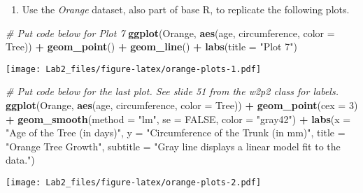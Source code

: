 \documentclass[
]{article}
\newenvironment{Shaded}{\begin{snugshade}}{\end{snugshade}}
\newcommand{\CommentTok}[1]{\textcolor[rgb]{0.56,0.35,0.01}{\textit{#1}}}
\newcommand{\DataTypeTok}[1]{\textcolor[rgb]{0.13,0.29,0.53}{#1}}
\newcommand{\DecValTok}[1]{\textcolor[rgb]{0.00,0.00,0.81}{#1}}
\newcommand{\KeywordTok}[1]{\textcolor[rgb]{0.13,0.29,0.53}{\textbf{#1}}}
\newcommand{\NormalTok}[1]{#1}
\newcommand{\OperatorTok}[1]{\textcolor[rgb]{0.81,0.36,0.00}{\textbf{#1}}}
\newcommand{\OtherTok}[1]{\textcolor[rgb]{0.56,0.35,0.01}{#1}}
\newcommand{\StringTok}[1]{\textcolor[rgb]{0.31,0.60,0.02}{#1}}
\providecommand{\tightlist}{%
  \setlength{\itemsep}{0pt}\setlength{\parskip}{0pt}}
\begin{document}
\newpage

\begin{enumerate}
\def\labelenumi{\arabic{enumi}.}
\setcounter{enumi}{2}
\tightlist
\item
  Use the \emph{Orange} dataset, also part of base R, to replicate the
  following plots.
\end{enumerate}

\begin{Shaded}
\begin{Highlighting}[]
\CommentTok{# Put code below for Plot 7}
\KeywordTok{ggplot}\NormalTok{(Orange, }\KeywordTok{aes}\NormalTok{(age, circumference, }\DataTypeTok{color =}\NormalTok{ Tree)) }\OperatorTok{+}
\StringTok{  }\KeywordTok{geom_point}\NormalTok{() }\OperatorTok{+}
\StringTok{  }\KeywordTok{geom_line}\NormalTok{() }\OperatorTok{+}
\StringTok{  }\KeywordTok{labs}\NormalTok{(}\DataTypeTok{title =} \StringTok{"Plot 7"}\NormalTok{)}
\end{Highlighting}
\end{Shaded}

\texttt{[image: Lab2\_files/figure-latex/orange-plots-1.pdf]}

\begin{Shaded}
\begin{Highlighting}[]
\CommentTok{# Put code below for the last plot. See slide 51 from the w2p2 class for labels.}
\KeywordTok{ggplot}\NormalTok{(Orange, }\KeywordTok{aes}\NormalTok{(age, circumference, }\DataTypeTok{color =}\NormalTok{ Tree)) }\OperatorTok{+}
\StringTok{  }\KeywordTok{geom_point}\NormalTok{(}\DataTypeTok{cex =} \DecValTok{3}\NormalTok{) }\OperatorTok{+}
\StringTok{  }\KeywordTok{geom_smooth}\NormalTok{(}\DataTypeTok{method =} \StringTok{"lm"}\NormalTok{, }\DataTypeTok{se =} \OtherTok{FALSE}\NormalTok{, }\DataTypeTok{color =} \StringTok{"gray42"}\NormalTok{) }\OperatorTok{+}
\StringTok{  }\KeywordTok{labs}\NormalTok{(}\DataTypeTok{x =} \StringTok{"Age of the Tree (in days)"}\NormalTok{,}
       \DataTypeTok{y =} \StringTok{"Circumference of the Trunk (in mm)"}\NormalTok{,}
       \DataTypeTok{title =} \StringTok{"Orange Tree Growth"}\NormalTok{,}
       \DataTypeTok{subtitle =} \StringTok{"Gray line displays a linear model fit to the data."}\NormalTok{)}
\end{Highlighting}
\end{Shaded}

\texttt{[image: Lab2\_files/figure-latex/orange-plots-2.pdf]}
\end{document}
